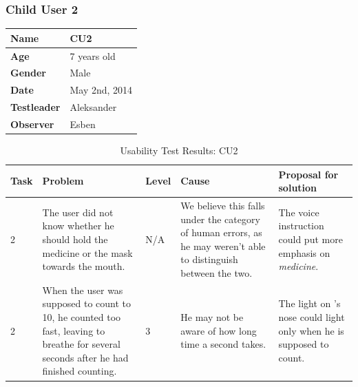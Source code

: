 \subsubsection{Child User 2}
\begin{table}[H]
\centering
\begin{tabular}{| p{4.0cm} | p{4.0cm} |}
\hline
 \textbf{Name} & CU2 \\
 \hline
 \textbf{Age} & 7 years old \\
 \hline 
 \textbf{Gender} & Male \\
 \hline
 \textbf{Date} & May 2nd, 2014 \\
 \hline
 \textbf{Testleader} & Aleksander \\
 \hline
 \textbf{Observer} & Esben \\
 \hline
\end{tabular}
\end{table}

\begin{table}[H]
\centering
\begin{tabular}{| p{1.0cm} | p{4.0cm} | p{0.9cm} | p{3.1cm} | p{3.7cm} |}
\hline
	\textbf{Task} & \textbf{Problem} & \textbf{Level} & \textbf{Cause} & \textbf{Proposal for solution} \\
	\hline
	2 & The user did not know whether he should hold the medicine or the mask towards the mouth. & N/A & We believe this falls under the category of human errors, as he may weren't able to distinguish between the two. & The voice instruction could put more emphasis on \emph{medicine}. \\
	\hline
	2 & When the user was supposed to count to 10, he counted too fast, leaving \ab{} to breathe for several seconds after he had finished counting. & 3 & He may not be aware of how long time a second takes. & The light on \ab{}'s nose could light only when he is supposed to count. \\
	\hline
\end{tabular}
\caption{Usability Test Results: CU2}
\label{tab:testchild2}
\end{table}

